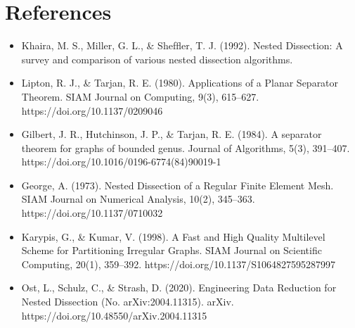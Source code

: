 \documentclass{article}
\begin{document}
\section*{References}
\begin{itemize}
    \item Khaira, M. S., Miller, G. L., \& Shefﬂer, T. J. (1992). Nested Dissection: A survey and comparison of various nested dissection algorithms.
    \item Lipton, R. J., \& Tarjan, R. E. (1980). Applications of a Planar Separator Theorem. SIAM Journal on Computing, 9(3), 615–627. https://doi.org/10.1137/0209046
    \item Gilbert, J. R., Hutchinson, J. P., \& Tarjan, R. E. (1984). A separator theorem for graphs of bounded genus. Journal of Algorithms, 5(3), 391–407. https://doi.org/10.1016/0196-6774(84)90019-1
    \item George, A. (1973). Nested Dissection of a Regular Finite Element Mesh. SIAM Journal on Numerical Analysis, 10(2), 345–363. https://doi.org/10.1137/0710032
    \item Karypis, G., \& Kumar, V. (1998). A Fast and High Quality Multilevel Scheme for Partitioning Irregular Graphs. SIAM Journal on Scientific Computing, 20(1), 359–392. https://doi.org/10.1137/S1064827595287997
    \item Ost, L., Schulz, C., \& Strash, D. (2020). Engineering Data Reduction for Nested Dissection (No. arXiv:2004.11315). arXiv. https://doi.org/10.48550/arXiv.2004.11315



\end{itemize}
\end{document}
